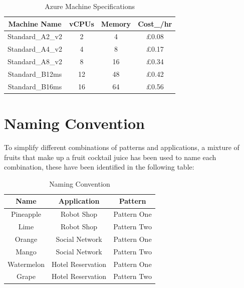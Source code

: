\begin{table}[H]
    \centering %
    \begin{tabular}{c c c c} %
    \toprule\toprule %
     Machine Name & vCPUs & Memory & Cost_{/hr} \\ [0.5ex] %
    \hline %
    Standard\_A2\_v2 & 2  & 4  & \pounds 0.08 \\ [0.5ex] 
    Standard\_A4\_v2 & 4  & 8  & \pounds 0.17 \\ [0.5ex] 
    Standard\_A8\_v2 & 8  & 16 & \pounds 0.34 \\ [0.5ex] 
    Standard\_B12ms & 12 & 48 & \pounds 0.42 \\  [0.5ex] 
    Standard\_B16ms & 16 & 64 & \pounds 0.56 \\  [0.5ex] 
    \toprule %
    \end{tabular}
    \label{table:nonlin} %
    \caption{Azure Machine Specifications} %

\end{table}


\section{Naming Convention}
To simplify different combinations of patterns and applications, a mixture of fruits that make up a fruit cocktail juice has been used to name each combination, these have been identified in the following table:

\begin{table}[H]
    \caption{Naming Convention} %
    \centering %
    \begin{tabular}{>{\raggedright\arraybackslash}c c c} %
        \hline %
        Name & Application & Pattern  \\ [0.5ex] %
        \hline%
        Pineapple   & Robot Shop     & Pattern One \\  [0.5ex] 
        Lime        & Robot Shop     & Pattern Two \\  [0.5ex] 
        Orange      & Social Network & Pattern One \\  [0.5ex] 
        Mango       & Social Network & Pattern Two \\  [0.5ex] 
        Watermelon  & Hotel Reservation  & Pattern One \\  [0.5ex] 
        Grape       & Hotel Reservation  & Pattern Two \\  [0.5ex] 
    
        \hline %
    \end{tabular}
    \label{table:nonlin} %
\end{table}

